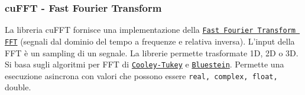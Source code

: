 \newpage

\subsubsection{cuFFT - Fast Fourier Transform}

La libreria cuFFT fornisce una implementazione della \href{https://en.wikipedia.org/wiki/Fast_Fourier_transform}{\texttt{Fast Fourier Transform FFT}} (segnali dal dominio del tempo a frequenze e relativa inversa). L'input della FFT è un sampling di un segnale. La librerie permette trasformate 1D, 2D o 3D. Si basa sugli algoritmi per FFT di \href{https://en.wikipedia.org/wiki/Cooley%E2%80%93Tukey_FFT_algorithm}{\texttt{Cooley-Tukey}} e \href{https://en.wikipedia.org/wiki/Chirp_Z-transform#Bluestein.27s_algorithm}{\texttt{Bluestein}}. Permette una esecuzione asincrona con valori che possono essere \texttt{rea\texttt{l}, \texttt{complex}, \texttt{float}, }double. \\

